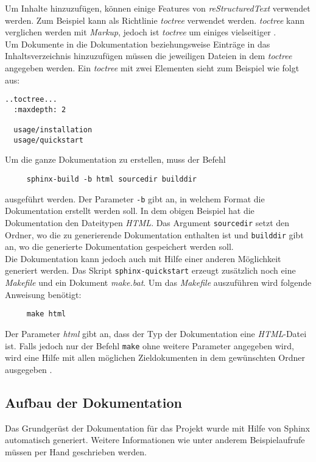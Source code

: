 \noindent
Um Inhalte hinzuzufügen, können einige Features von \textit{reStructuredText} verwendet werden. Zum Beispiel kann als Richtlinie \textit{toctree} verwendet werden. \textit{toctree} kann verglichen werden mit \textit{Markup}, jedoch ist \textit{toctree} um einiges vielseitiger \footnotemark[31]. 
\\

\noindent
Um Dokumente in die Dokumentation beziehungsweise Einträge in das Inhaltsverzeichnis hinzuzufügen müssen die jeweiligen Dateien in dem \textit{toctree} angegeben werden. Ein \textit{toctree} mit zwei Elementen sieht zum Beispiel wie folgt aus\footnotemark[31]:
\pra
\begin{verbatim}
..toctree...
  :maxdepth: 2
  
  usage/installation
  usage/quickstart

\end{verbatim}
\noindent
Um die ganze Dokumentation zu erstellen, muss der Befehl
\begin{verbatim}
     sphinx-build -b html sourcedir builddir
\end{verbatim} 
ausgeführt werden. Der Parameter \verb|-b| gibt an, in welchem Format die Dokumentation erstellt werden soll. In dem obigen Beispiel hat die Dokumentation den Dateitypen \textit{HTML}. Das Argument \verb|sourcedir| setzt den Ordner, wo die zu generierende Dokumentation enthalten ist und \verb|builddir| gibt an, wo die generierte Dokumentation gespeichert werden soll.
\\

\noindent
Die Dokumentation kann jedoch auch mit Hilfe einer anderen Möglichkeit generiert werden. Das Skript \verb|sphinx-quickstart| erzeugt zusätzlich noch eine \textit{Makefile} und ein Dokument \textit{make.bat}. Um das \textit{Makefile} auszuführen wird folgende Anweisung benötigt\footnotemark[32]:
\\

\begin{verbatim}
     make html
\end{verbatim}
\noindent
Der Parameter \textit{html} gibt an, dass der Typ der Dokumentation eine \textit{HTML}-Datei ist. Falls jedoch nur der Befehl \verb|make| ohne weitere Parameter angegeben wird, wird eine Hilfe mit allen möglichen Zieldokumenten in dem gewünschten Ordner ausgegeben \footnotemark[32].
\\
\subsection{Aufbau der Dokumentation}
\pra
\noindent
Das Grundgerüst der Dokumentation für das Projekt wurde mit Hilfe von Sphinx automatisch generiert. Weitere Informationen wie unter anderem Beispielaufrufe müssen per Hand geschrieben werden.
\\

